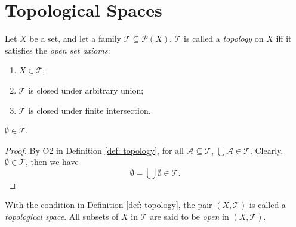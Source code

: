 \section{Topological Spaces}



\begin{definition}
	[topology]
	\label{def: topology}
	Let $X$ be a set, and let a family $\mathcal T \subseteq \mathcal P(X)$. $\mathcal T$ is called a \textit{topology} on $X$ iff it satisfies the \textit{open set axioms}:
	\begin{enumerate}[\bf O1.]
		\item $X \in \mathcal T$;
		\item $\mathcal T$ is closed under arbitrary union;
		\item $\mathcal T$ is closed under finite intersection.
	\end{enumerate}
\end{definition}


\begin{theorem}
	$\emptyset \in \mathcal T$.
	
	\begin{proof}
		By O2 in Definition \ref{def: topology}, for all $\mathcal A \subseteq \mathcal T$, $\bigcup \mathcal A \in \mathcal T$. Clearly, $\emptyset \in \mathcal T$, then we have
		$$
		\emptyset = \bigcup \emptyset \in \mathcal T.
		$$
	\end{proof}
\end{theorem}


\begin{definition}
	\label{def: topological spaces}
	With the condition in Definition \ref{def: topology}, the pair $(X, \mathcal T)$ is called a \textit{topological space}. All subsets of $X$ in $\mathcal T$ are said to be \textit{open} in $(X, \mathcal T)$.
\end{definition}



